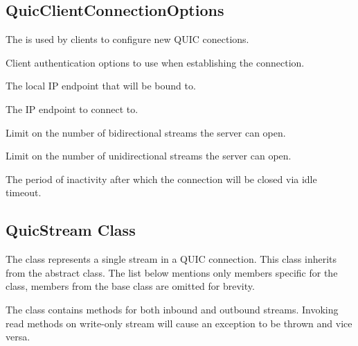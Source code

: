 \subsection{QuicClientConnectionOptions}

The  is used by clients to configure new QUIC conections.

\begin{description}

     Client authentication options to use when establishing the connection.

     The local IP endpoint that will be bound to.

     The IP endpoint to connect to.

     Limit on the number of bidirectional streams the server can open.

     Limit on the number of unidirectional streams the server can open.

     The period of inactivity after which the connection will be closed via idle timeout.

\end{description}

\subsection{QuicStream Class}

The  class represents a single stream in a QUIC connection. This class inherits
from the abstract  class. The list below mentions only members specific for the
 class, members from the  base class are omitted for brevity.

The class contains methods for both inbound and outbound streams. Invoking read methods on
write-only stream will cause an exception to be thrown and vice versa.

\todo

